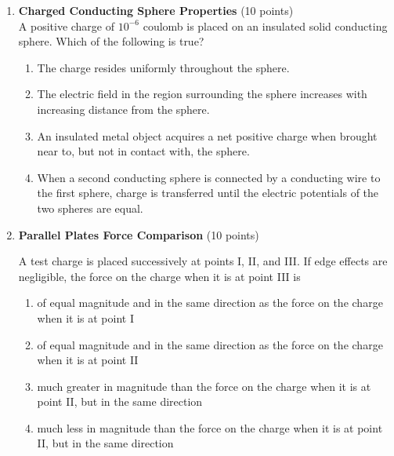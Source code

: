 \begin{enumerate}
  \item \textbf{Charged Conducting Sphere Properties} (10 points)\\
  A positive charge of $10^{-6}$ coulomb is placed on an insulated solid conducting sphere. Which of the following is true?
  \begin{enumerate}[label=(\Alph*)]
    \item The charge resides uniformly throughout the sphere.
    \item The electric field in the region surrounding the sphere increases with increasing distance from the sphere.
    \item An insulated metal object acquires a net positive charge when brought near to, but not in contact with, the sphere.
    \item When a second conducting sphere is connected by a conducting wire to the first sphere, charge is transferred until the electric potentials of the two spheres are equal.
  \end{enumerate}
  \begin{subanswer}
  \end{subanswer}

  \item \textbf{Parallel Plates Force Comparison} (10 points)\\
  
  A test charge is placed successively at points I, II, and III. If edge effects are negligible, the force on the charge when it is at point III is
  \begin{enumerate}[label=(\Alph*)]
    \item of equal magnitude and in the same direction as the force on the charge when it is at point I
    \item of equal magnitude and in the same direction as the force on the charge when it is at point II
    \item much greater in magnitude than the force on the charge when it is at point II, but in the same direction
    \item much less in magnitude than the force on the charge when it is at point II, but in the same direction
  \end{enumerate}
  \begin{subanswer}
  \end{subanswer}


\end{enumerate}
